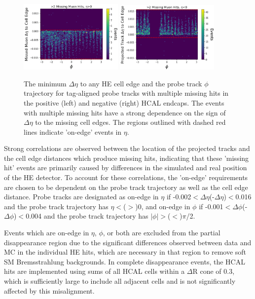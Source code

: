 \begin{figure}[htpb]
    \includegraphics[width=0.45\textwidth]{figures/posEtaEdgeEventsData.png} 
    \hspace{0.01\textwidth}
    \includegraphics[width=0.45\textwidth]{figures/negEtaEdgeEventsData.png}
    \centering
	\caption[$\eta$ edge correlations in missing HCAL muon hits.]{The minimum $\Delta\eta$ to any HE cell edge and the probe track $\phi$ trajectory for tag-aligned probe tracks with multiple missing hits in the positive (left) and negative (right) HCAL endcaps. The events with multiple missing hits have a strong dependence on the sign of $\Delta\eta$ to the missing cell edges. The regions outlined with dashed red lines indicate 'on-edge' events in $\eta$.}
    \label{fig:etaEdgeCorr}
\end{figure}

Strong correlations are observed between the location of the projected tracks and the cell edge distances which produce missing hits, indicating that these 'missing hit' events are primarily caused by differences in the simulated and real position of the HE detector.
To account for these correlations, the 'on-edge' requirements are chosen to be dependent on the probe track trajectory as well as the cell edge distance. 
Probe tracks are designated as on-edge in $\eta$ if -0.002$<\Delta\eta$(-$\Delta\eta$)$<$0.016 and the probe track trajectory has $\eta<$($>$)0, and on-edge in $\phi$ if -0.001$<\Delta\phi$(-$\Delta\phi$)$<$0.004 and the probe track trajectory has $|\phi|>$($<$)$\pi$/2.

Events which are on-edge in $\eta$, $\phi$, or both are excluded from the partial disappearance region due to the significant differences observed between data and MC in the individual HE hits, which are necessary in that region to remove soft SM Bremsstrahlung backgrounds.
In complete disappearance events, the HCAL hits are implemented using sums of all HCAL cells within a $\Delta$R cone of 0.3, which is sufficiently large to include all adjacent cells and is not significantly affected by this misalignment.

